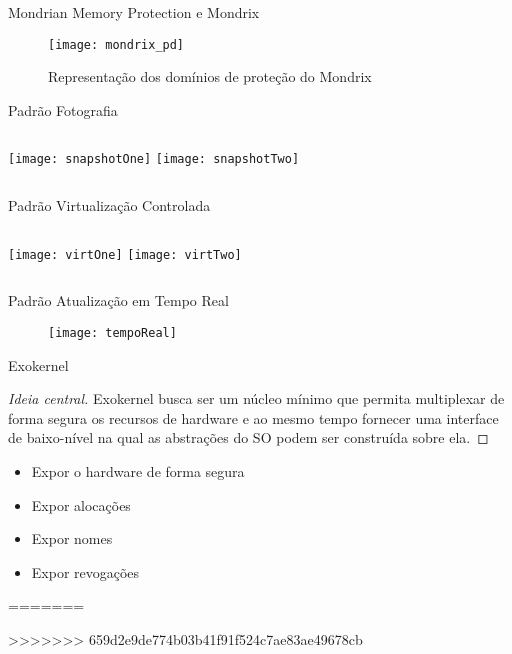 \documentclass[xcolor={usenames,svgnames,dvipsnames},brazil,english,12pt,aspectratio=149]{beamer}
\newcommand\col{\column{.5\textwidth}}
\begin{document}
\begin{frame}{Mondrian Memory Protection e Mondrix}
  \begin{figure}[!h]
    \centering
    \texttt{[image: mondrix\_pd]}
    \caption*{Representação dos domínios de proteção do Mondrix}
  \end{figure}
\end{frame}


\begin{frame}[t]{Padrão Fotografia}
  \begin{columns}
    \col
      \centering
      \texttt{[image: snapshotOne]}
    \col
      \centering
      \texttt{[image: snapshotTwo]}
  \end{columns}
\end{frame}

\begin{frame}{Padrão Virtualização Controlada}
  \begin{columns}[t]
    \col
      \centering
      \texttt{[image: virtOne]}
    \col
      \centering
      \texttt{[image: virtTwo]}
  \end{columns}
\end{frame}

\begin{frame}{Padrão Atualização em Tempo Real}
  \begin{figure}[!h]
    \centering
    \texttt{[image: tempoReal]}
  \end{figure}
\end{frame}

\begin{frame}{Exokernel}
  \begin{proof}[Ideia central]
Exokernel busca ser um núcleo mínimo que permita multiplexar de forma segura os
recursos de hardware e ao mesmo tempo fornecer uma interface de baixo-nível na
qual as abstrações do SO podem ser construída sobre ela.
  \end{proof}

  \begin{itemize}
    \item Expor o hardware de forma segura
    \item Expor alocações
    \item Expor nomes
    \item Expor revogações
  \end{itemize}

\end{frame}
=======
%

\par

>>>>>>> 659d2e9de774b03b41f91f524c7ae83ae49678cb
\end{document}
